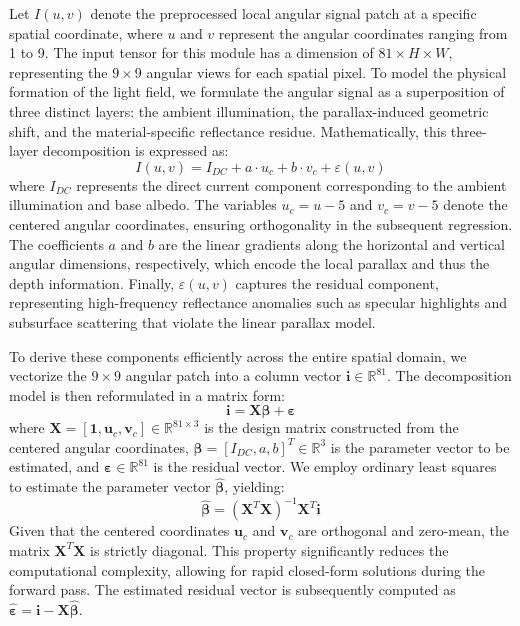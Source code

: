 \documentclass[lettersize,journal]{IEEEtran}
\begin{document}
Let $I(u,v)$ denote the preprocessed local angular signal patch at a specific spatial coordinate, where $u$ and $v$ represent the angular coordinates ranging from 1 to 9. The input tensor for this module has a dimension of $81 \times H \times W$, representing the $9 \times 9$ angular views for each spatial pixel. To model the physical formation of the light field, we formulate the angular signal as a superposition of three distinct layers: the ambient illumination, the parallax-induced geometric shift, and the material-specific reflectance residue. Mathematically, this three-layer decomposition is expressed as:
\begin{equation}
I(u,v) = I_{DC} + a \cdot u_c + b \cdot v_c + \varepsilon(u,v)
\label{eq:ch3_3}
\end{equation}
where $I_{DC}$ represents the direct current component corresponding to the ambient illumination and base albedo. The variables $u_c = u - 5$ and $v_c = v - 5$ denote the centered angular coordinates, ensuring orthogonality in the subsequent regression. The coefficients $a$ and $b$ are the linear gradients along the horizontal and vertical angular dimensions, respectively, which encode the local parallax and thus the depth information. Finally, $\varepsilon(u,v)$ captures the residual component, representing high-frequency reflectance anomalies such as specular highlights and subsurface scattering that violate the linear parallax model.

To derive these components efficiently across the entire spatial domain, we vectorize the $9 \times 9$ angular patch into a column vector $\mathbf{i} \in \mathbb{R}^{81}$. The decomposition model is then reformulated in a matrix form:
\begin{equation}
\mathbf{i} = \mathbf{X} \boldsymbol{\beta} + \boldsymbol{\varepsilon}
\label{eq:ch3_4}
\end{equation}
where $\mathbf{X} = [\mathbf{1}, \mathbf{u}_c, \mathbf{v}_c] \in \mathbb{R}^{81 \times 3}$ is the design matrix constructed from the centered angular coordinates, $\boldsymbol{\beta} = [I_{DC}, a, b]^T \in \mathbb{R}^{3}$ is the parameter vector to be estimated, and $\boldsymbol{\varepsilon} \in \mathbb{R}^{81}$ is the residual vector. We employ ordinary least squares to estimate the parameter vector $\hat{\boldsymbol{\beta}}$, yielding:
\begin{equation}
\hat{\boldsymbol{\beta}} = (\mathbf{X}^T \mathbf{X})^{-1} \mathbf{X}^T \mathbf{i}
\label{eq:ch3_5}
\end{equation}
Given that the centered coordinates $\mathbf{u}_c$ and $\mathbf{v}_c$ are orthogonal and zero-mean, the matrix $\mathbf{X}^T \mathbf{X}$ is strictly diagonal. This property significantly reduces the computational complexity, allowing for rapid closed-form solutions during the forward pass. The estimated residual vector is subsequently computed as $\hat{\boldsymbol{\varepsilon}} = \mathbf{i} - \mathbf{X} \hat{\boldsymbol{\beta}}$.
\end{document}
